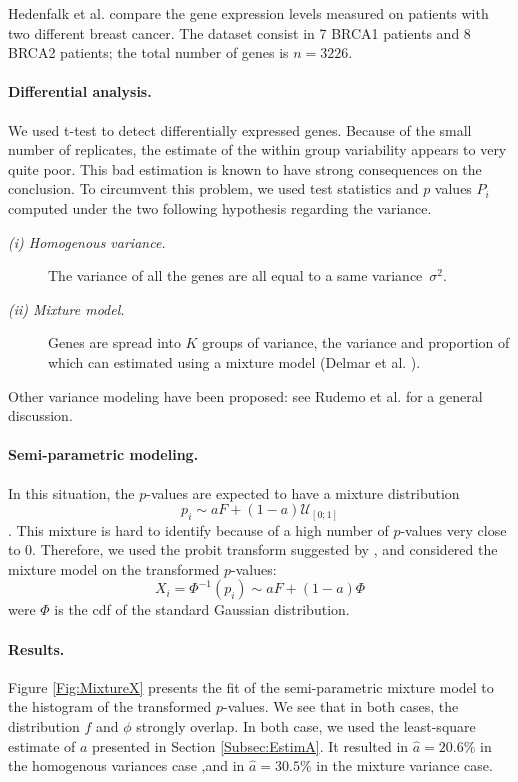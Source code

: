 \documentclass[10pt]{article}
\newcommand{\Ucal}{{\mathcal U}}
\begin{document}
Hedenfalk et al. \cite{HDC01} compare the gene expression levels measured on patients with two different breast cancer. The dataset consist in 7 BRCA1 patients
and 8 BRCA2 patients; the total number of genes is $n=3226$.

\paragraph{Differential analysis.} We used t-test to detect
differentially expressed genes. Because of the small number of replicates, the estimate of the within group variability appears to very quite poor. This bad
estimation is known to have strong consequences on the conclusion. To circumvent this problem, we used test statistics and $p$ values $P_i$ computed under the
two following hypothesis regarding the variance.
\begin{description}
\item[{\sl (i) Homogenous variance.}] The variance of all the genes are
  all equal to a same variance~$\sigma^2$.
\item[{\sl (ii) Mixture model.}] Genes are spread into $K$ groups of
  variance, the variance and proportion of which can estimated using  a
  mixture model  (Delmar et al. \cite{DRL05}).
\end{description}
Other variance modeling have been proposed: see Rudemo et al. \cite{RLM02} for a general discussion.

\paragraph{Semi-parametric modeling.} In this situation, the
$p$-values are expected to have a mixture distribution $$p_i\sim a F + (1-a) \Ucal_{[0; 1]}$$. This mixture is hard to identify because of a high number of
$p$-values very close to 0. Therefore, we used the probit transform suggested by \cite{Efr03}, and considered the mixture model on the transformed $p$-values:
$$
X_i = \Phi^{-1}(p_i) \sim a F + (1-a) \Phi
$$
were $\Phi$ is the cdf of the standard Gaussian distribution.

\paragraph{Results.} Figure \ref{Fig:MixtureX} presents the fit of the
semi-parametric mixture model to the histogram of the transformed
$p$-values. We see that in both cases, the distribution $f$ and $\phi$
strongly overlap. In both case, we used the least-square estimate of
$a$ presented in Section \ref{Subsec:EstimA}. It resulted in
$\widehat{a} = 20.6 \%$ in the homogenous variances case ,and in
$\widehat{a} = 30.5 \%$ in the mixture variance case.
\end{document}
